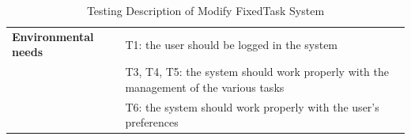 \begin{table}[H]
\begin{tabular}{p{4.55cm} p{7cm}}
        \textbf{Environmental needs}    & T1: the user should be logged in the system\\
                                        & T3, T4, T5: the system should work properly with the management of the various tasks \\
                                        & T6: the system should work properly with the user's preferences \\
        
        \hline
        
    \end{tabular}
    \caption{Testing Description of Modify FixedTask System}
    
\end{table}
